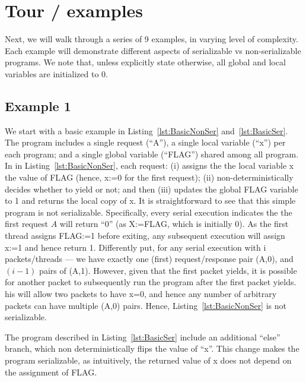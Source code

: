 \newpage


\section{Tour / examples}
\label{sec:tour}

Next, we will walk through a series of 9 examples, in varying level of complexity. Each example will demonstrate different aspects of serializable vs non-serializable programs.
%
We note that, unless explicitly state otherwise, all global and local variables are initialized to 0.


\subsection{Example 1}

We start with a basic example in Listing~\ref{lst:BasicNonSer} and~\ref{lst:BasicSer}. The program includes a single request (``A''), a single local variable (``x'') per each program; and a single global variable (``FLAG'') shared among all program. 
%
In in Listing~\ref{lst:BasicNonSer}, each request: (i) assigns the the local variable x the value of FLAG (hence, x:=0 for the first request); (ii) non-deterministically decides whether to yield or not; and then (iii) updates the global FLAG variable to 1 and returns the local copy of x. 
%
It is straightforward to see that this simple program is not serializable. Specifically, every serial execution indicates the the first request $A$ will return ``0'' (as X:=FLAG, which is initially 0). As the first thread assigns FLAG:=1 before exiting, any subsequent execution will assign x:=1 and hence return 1. Differently put, for any serial execution with i packets/threads --- we have exactly one (first) request/response pair (A,0), and $(i-1)$ pairs of (A,1).
%
However, given that the first packet yields, it is possible for another packet to subsequently run the program after the first packet yields. his will allow two packets to have x=0, and hence any number of arbitrary packets can have multiple (A,0) pairs. Hence, Listing~\ref{lst:BasicNonSer} is not serializable.


The program described in Listing~\ref{lst:BasicSer} include an additional ``else'' branch, which non deterministically flips the value of ``x''. This change makes the program serializable, as intuitively, the returned value of x does not depend on the assignment of FLAG.


